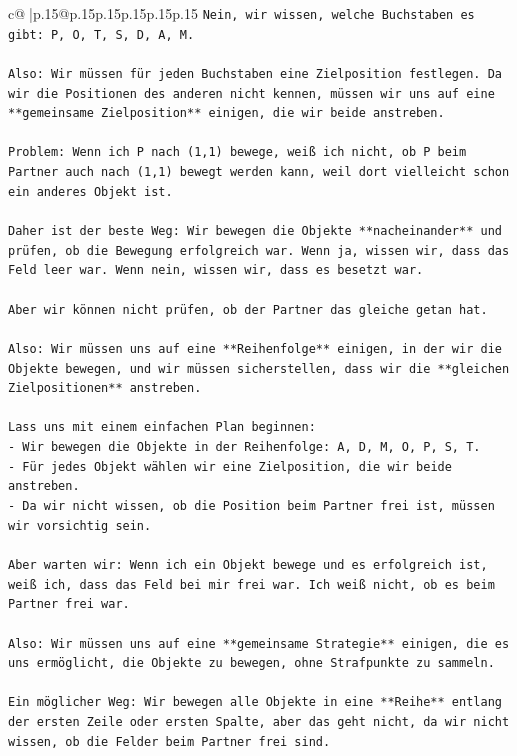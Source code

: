 \documentclass{article}
\begin{document}
{\begin{supertabular}{c@{$\;$}|p{.15\linewidth}@{}p{.15\linewidth}p{.15\linewidth}p{.15\linewidth}p{.15\linewidth}p{.15\linewidth}}
{{{\texttt{Nein, wir wissen, welche Buchstaben es gibt: P, O, T, S, D, A, M.} \\
\\ 
\texttt{Also: Wir müssen für jeden Buchstaben eine Zielposition festlegen. Da wir die Positionen des anderen nicht kennen, müssen wir uns auf eine **gemeinsame Zielposition** einigen, die wir beide anstreben.} \\
\\ 
\texttt{Problem: Wenn ich P nach (1,1) bewege, weiß ich nicht, ob P beim Partner auch nach (1,1) bewegt werden kann, weil dort vielleicht schon ein anderes Objekt ist.} \\
\\ 
\texttt{Daher ist der beste Weg: Wir bewegen die Objekte **nacheinander** und prüfen, ob die Bewegung erfolgreich war. Wenn ja, wissen wir, dass das Feld leer war. Wenn nein, wissen wir, dass es besetzt war.} \\
\\ 
\texttt{Aber wir können nicht prüfen, ob der Partner das gleiche getan hat.} \\
\\ 
\texttt{Also: Wir müssen uns auf eine **Reihenfolge** einigen, in der wir die Objekte bewegen, und wir müssen sicherstellen, dass wir die **gleichen Zielpositionen** anstreben.} \\
\\ 
\texttt{Lass uns mit einem einfachen Plan beginnen:} \\
\texttt{{-} Wir bewegen die Objekte in der Reihenfolge: A, D, M, O, P, S, T.} \\
\texttt{{-} Für jedes Objekt wählen wir eine Zielposition, die wir beide anstreben.} \\
\texttt{{-} Da wir nicht wissen, ob die Position beim Partner frei ist, müssen wir vorsichtig sein.} \\
\\ 
\texttt{Aber warten wir: Wenn ich ein Objekt bewege und es erfolgreich ist, weiß ich, dass das Feld bei mir frei war. Ich weiß nicht, ob es beim Partner frei war.} \\
\\ 
\texttt{Also: Wir müssen uns auf eine **gemeinsame Strategie** einigen, die es uns ermöglicht, die Objekte zu bewegen, ohne Strafpunkte zu sammeln.} \\
\\ 
\texttt{Ein möglicher Weg: Wir bewegen alle Objekte in eine **Reihe** entlang der ersten Zeile oder ersten Spalte, aber das geht nicht, da wir nicht wissen, ob die Felder beim Partner frei sind.} \\
}}}
\end{supertabular}}
\end{document}
